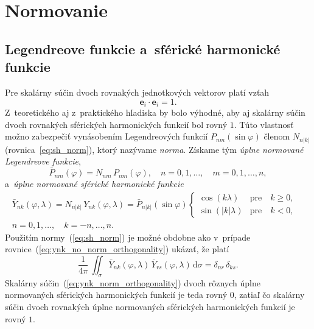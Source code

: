 \documentclass[a4paper, 12pt]{book}
\newcommand{\diff}{\mathrm d}
\let\vec\mathbf
\begin{document}
\section{Normovanie}
\label{sec:normalization}

\subsection{Legendreove funkcie a~sférické harmonické funkcie}

Pre skalárny súčin dvoch rovnakých jednotkových vektorov platí vzťah
%
\begin{equation}
\vec e_i \cdot \vec e_i = 1{.}
\end{equation}
%
Z~teoretického aj z~praktického hľadiska by bolo výhodné, aby aj skalárny súčin
dvoch rovnakých sférických harmonických funkcií bol rovný $1$.  Túto vlastnosť
možno zabezpečiť vynásobením Legendreových funkcií $P_{nm}(\sin\varphi)$ členom
$N_{n|k|}$ (rovnica~\ref{eq:sh_norm}), ktorý nazývame \emph{norma}.  Získame
tým \emph{úplne normované Legendreove funkcie},
%
\begin{equation}
\bar{P}_{nm}(\varphi) = N_{nm} \, P_{nm}(\varphi){,} \quad  n = 0, 1, \dots,
\quad m = 0, 1, \dots, n{,}
\end{equation}
%
a~\emph{úplne normované sférické harmonické funkcie}
%
\begin{equation}
\label{eq:ynk_norm}
\begin{split}
\bar{Y}_{nk}(\varphi, \lambda) = N_{n|k|} \, Y_{nk}(\varphi, \lambda)
= \bar{P}_{n|k|}(\sin\varphi)
%
\begin{cases}
\cos(k\lambda)    &\text{pre} \quad k \geq 0{,}\\
\sin(|k|\lambda)  &\text{pre} \quad k < 0{,}
\end{cases}
&
%
\\
n = 0, 1, \dots, \quad k = -n, \dots, n{.}&
\end{split}
\end{equation}
%
Použitím normy~(\ref{eq:sh_norm}) je možné obdobne ako v~prípade
rovnice~(\ref{eq:ynk_no_norm_orthogonality}) ukázať, že platí
%
\begin{equation}
\label{eq:ynk_norm_orthogonality}
\frac{1}{4\pi} \, \iint_{\sigma} \bar{Y}_{nk}(\varphi, \lambda) \,
\bar{Y}_{rs}(\varphi, \lambda) \, \diff \sigma = \delta_{nr} \, \delta_{ks}{.}
\end{equation}
%
Skalárny súčin~(\ref{eq:ynk_norm_orthogonality}) dvoch rôznych úplne
normovaných sférických harmonických funkcií je teda rovný 0, zatiaľ čo skalárny
súčin dvoch rovnakých úplne normovaných sférických harmonických funkcií je
rovný $1$.
\end{document}
